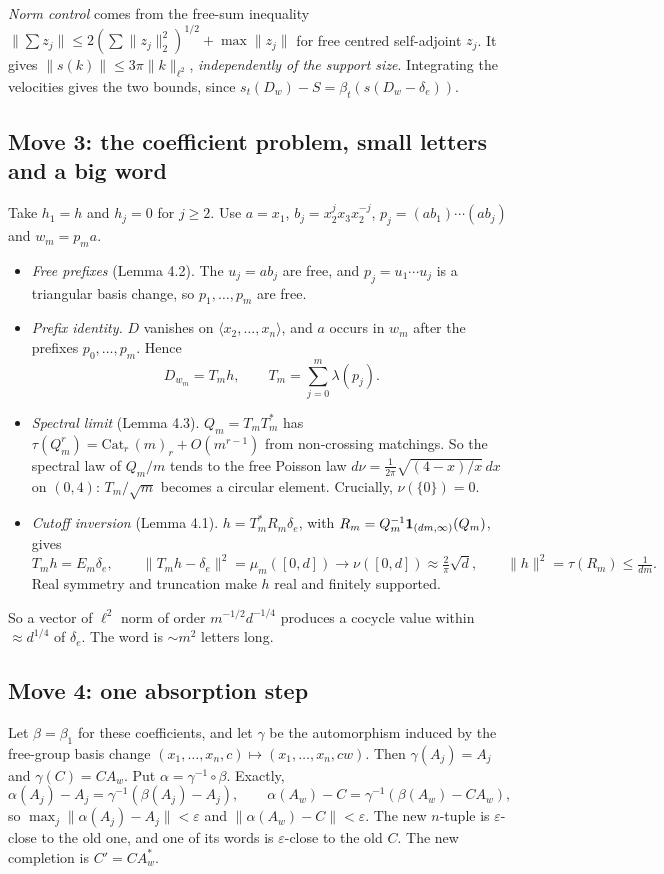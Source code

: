 \emph{Norm control} comes from the free-sum inequality $\|\sum z_j\|\le2(\sum\|z_j\|_2^2)^{1/2}+\max\|z_j\|$ for free centred self-adjoint $z_j$. It gives $\|s(k)\|\le3\pi\|k\|_{\ell^2}$,
\emph{independently of the support size}. Integrating the velocities gives the two bounds, since $s_t(D_w)-S=\beta_t(s(D_w-\delta_e))$.

\subsection{Move 3: the coefficient problem, small letters and a big word}
Take $h_1=h$ and $h_j=0$ for $j\ge2$. Use $a=x_1$, $b_j=x_2^jx_3x_2^{-j}$, $p_j=(ab_1)\cdots(ab_j)$ and $w_m=p_ma$.
\begin{itemize}[leftmargin=*]
\item \emph{Free prefixes} (Lemma 4.2). The $u_j=ab_j$ are free, and $p_j=u_1\cdots u_j$ is a triangular basis change, so $p_1,\dots,p_m$ are free.
\item \emph{Prefix identity.} $D$ vanishes on $\langle x_2,\dots,x_n\rangle$, and $a$ occurs in $w_m$ after the prefixes $p_0,\dots,p_m$. Hence
\[
D_{w_m}=T_mh,\qquad T_m=\sum_{j=0}^m\lambda(p_j).
\]
\item \emph{Spectral limit} (Lemma 4.3). $Q_m=T_mT_m^*$ has $\tau(Q_m^r)=\mathrm{Cat}_r\,(m)_r+O(m^{r-1})$ from non-crossing matchings. So the spectral law of
$Q_m/m$ tends to the free Poisson law $d\nu=\frac1{2\pi}\sqrt{(4-x)/x}\,dx$ on $(0,4)$: $T_m/\sqrt m$ becomes a circular element. Crucially, $\nu(\{0\})=0$.
\item \emph{Cutoff inversion} (Lemma 4.1). $h=T_m^*R_m\delta_e$, with $R_m=Q_m^{-1}\mathbf 1_{(dm,\infty)}(Q_m)$, gives
\[
T_mh=E_m\delta_e,\qquad \|T_mh-\delta_e\|^2=\mu_m([0,d])\to\nu([0,d])\approx\tfrac2\pi\sqrt d,\qquad \|h\|^2=\tau(R_m)\le\tfrac1{dm}.
\]
Real symmetry and truncation make $h$ real and finitely supported.
\end{itemize}
So a vector of $\ell^2$ norm of order $m^{-1/2}d^{-1/4}$ produces a cocycle value within $\approx d^{1/4}$ of $\delta_e$. The word is $\sim m^2$ letters long.

\subsection{Move 4: one absorption step}
Let $\beta=\beta_1$ for these coefficients, and let $\gamma$ be the automorphism induced by the free-group basis change $(x_1,\dots,x_n,c)\mapsto(x_1,\dots,x_n,cw)$. Then
$\gamma(A_j)=A_j$ and $\gamma(C)=CA_w$. Put $\alpha=\gamma^{-1}\circ\beta$. Exactly,
\[
\alpha(A_j)-A_j=\gamma^{-1}(\beta(A_j)-A_j),\qquad \alpha(A_w)-C=\gamma^{-1}(\beta(A_w)-CA_w),
\]
so $\max_j\|\alpha(A_j)-A_j\|<\varepsilon$ and $\|\alpha(A_w)-C\|<\varepsilon$. The new $n$-tuple is $\varepsilon$-close to the old one, and one of its words is $\varepsilon$-close to the old $C$.
The new completion is $C'=CA_w^*$.

